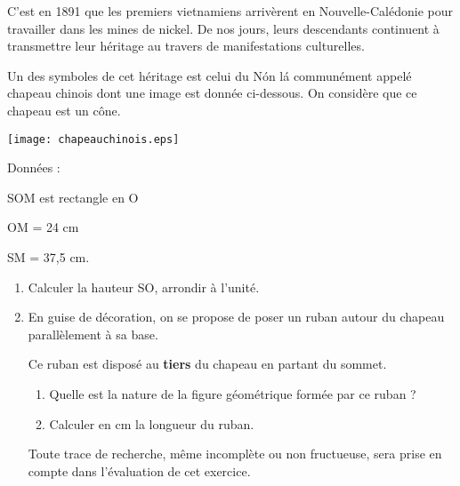 
\medskip  

C'est en 1891 que les premiers vietnamiens arrivèrent en Nouvelle-Calédonie pour travailler dans les mines de nickel. De nos jours, leurs descendants continuent à transmettre leur héritage au travers de manifestations culturelles. 

Un des symboles de cet héritage est celui du \og N\'on l\'a \fg{} communément appelé chapeau chinois dont une image est donnée ci-dessous. On considère que ce chapeau est un cône. 

\parbox{0.65\linewidth}{
\texttt{[image: chapeauchinois.eps]}}\hfill\parbox{0.3\linewidth}{Données : 

SOM est rectangle en O 

OM = 24 cm 

SM = 37,5 cm.}

\medskip
 
\begin{enumerate}
\item Calculer la hauteur SO, arrondir à l'unité. 
\item En guise de décoration, on se propose de poser un ruban autour du chapeau parallèlement à sa base. 

Ce ruban est disposé au \textbf{tiers} du chapeau en partant du sommet. 
	\begin{enumerate}
		\item Quelle est la nature de la figure géométrique formée par ce ruban ? 
		\item Calculer en cm la longueur du ruban. 
	\end{enumerate}
Toute trace de recherche, même incomplète ou non fructueuse, sera prise en compte dans l'évaluation de cet exercice. 
\end{enumerate}

\vspace{0,5cm}

